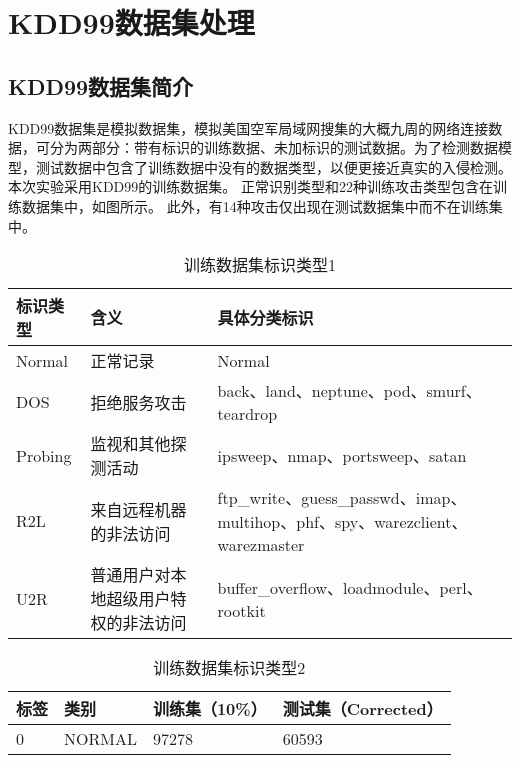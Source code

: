 \section{KDD99数据集处理}

\subsection{KDD99数据集简介}
KDD99数据集是模拟数据集，模拟美国空军局域网搜集的大概九周的网络连接数据，可分为两部分：带有标识的训练数据、未加标识的测试数据。为了检测数据模型，测试数据中包含了训练数据中没有的数据类型，以便更接近真实的入侵检测。本次实验采用KDD99的训练数据集。
正常识别类型和22种训练攻击类型包含在训练数据集中，如图所示。 此外，有14种攻击仅出现在测试数据集中而不在训练集中。



\begin{table}[h]\wuhao
	\centering  %
	\caption{训练数据集标识类型1} 
	\label{}
	\begin{spacing}{1.35}  %
	\begin{tabular}{p{3cm}<{\raggedright}p{4cm}<{\raggedright}p{6cm}<{\raggedright}}
		\hline
		标识类型    & 含义                 & 具体分类标识                                                                 \\ \hline
		Normal  & 正常记录               & Normal                                                                 \\
		DOS     & 拒绝服务攻击             & back、land、neptune、pod、smurf、teardrop                                   \\
		Probing & 监视和其他探测活动          & ipsweep、nmap、portsweep、satan                                           \\
		R2L     & 来自远程机器的非法访问        & ftp\_write、guess\_passwd、imap、multihop、phf、spy、warezclient、warezmaster \\
		U2R     & 普通用户对本地超级用户特权的非法访问 & buffer\_overflow、loadmodule、perl、rootkit                               \\ \hline
	\end{tabular} 
	\end{spacing}
\end{table}


\begin{table}[h]
	\centering
	\caption{训练数据集标识类型2}
	\label{}
	\begin{spacing}{1.35}  %
	\begin{tabular}{@{}llll@{}}
		\toprule
		标签 & 类别     & 训练集（10\%） & 测试集（Corrected） \\ \midrule
		0  & NORMAL & 97278     & 60593         
	\end{tabular}
	\end{spacing}
\end{table}



